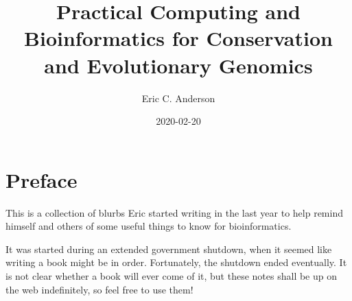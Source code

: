 \documentclass[]{krantz}
\title{Practical Computing and Bioinformatics for Conservation and Evolutionary Genomics}
\author{Eric C. Anderson}
\date{2020-02-20}
\begin{document}
\maketitle


\thispagestyle{empty}

\begin{center}

\end{center}

\setlength{\abovedisplayskip}{-5pt}
\setlength{\abovedisplayshortskip}{-5pt}

{
\hypersetup{linkcolor=}
\setcounter{tocdepth}{2}
\tableofcontents
}
\listoftables
\listoffigures
\newcommand{\bitsfa}{{\circ}{\circ}{\circ}{\bullet}}
\newcommand{\bitsfb}{{\circ}{\circ}{\bullet}{\circ}}
\newcommand{\bitsfc}{{\circ}{\bullet}{\circ}{\circ}}
\newcommand{\bitsfd}{{\bullet}{\circ}{\circ}{\circ}}
\newcommand{\bitsopen}{{\circ}{\circ}{\circ}{\circ}}

\newcommand{\bitsa}{\bitsopen~\bitsopen~\bitsfa}
\newcommand{\bitsb}{\bitsopen~\bitsopen~\bitsfb}
\newcommand{\bitsc}{\bitsopen~\bitsopen~\bitsfc}
\newcommand{\bitsd}{\bitsopen~\bitsopen~\bitsfd}

\newcommand{\bitse}{\bitsopen~\bitsfa~\bitsopen}
\newcommand{\bitsf}{\bitsopen~\bitsfb~\bitsopen}
\newcommand{\bitsg}{\bitsopen~\bitsfc~\bitsopen}
\newcommand{\bitsh}{\bitsopen~\bitsfd~\bitsopen}

\newcommand{\bitsi}{\bitsfa~\bitsopen~\bitsopen}
\newcommand{\bitsj}{\bitsfb~\bitsopen~\bitsopen}
\newcommand{\bitsk}{\bitsfc~\bitsopen~\bitsopen}
\newcommand{\bitsl}{\bitsfd~\bitsopen~\bitsopen}
\newcommand{\bitsmany}{\bitsopen~{\circ}{\bullet}{\circ}{\bullet}~{\circ}{\circ}{\bullet}{\bullet}}

\hypertarget{preface}{%
\chapter*{Preface}\label{preface}}


This is a collection of blurbs Eric started writing in the last year to
help remind himself and others of some useful things to know for bioinformatics.

It was started during an extended government shutdown, when it seemed like writing a book
might be in order. Fortunately, the shutdown ended eventually. It is not clear whether a
book will ever come of it, but these notes shall be up on the web indefinitely, so feel free to use
them!
\end{document}
